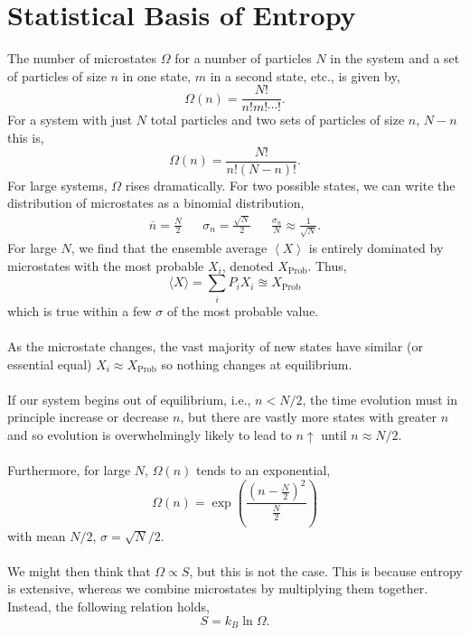 \documentclass{book}
\begin{document}
\section{Statistical Basis of Entropy}
The number of microstates $\Omega$ for a number of particles $N$ in the system and a set of particles of size $n$ in one state, $m$ in a second state, etc., is given by,
\begin{equation}
	\Omega(n) = \frac{N!}{n!m!\cdots!}.
\end{equation}
For a system with just $N$ total particles and two sets of particles of size $n$, $N-n$ this is,
\begin{equation}
	\Omega(n) = \frac{N!}{n!(N-n)!}.
\end{equation}
For large systems, $\Omega$ rises dramatically. For two possible states, we can write the distribution of microstates as a binomial distribution,
\begin{align}
	\overline{n} = \frac{N}{2} && \sigma_n = \frac{\sqrt{N}}{2} && \frac{\sigma_n}{N} \approx \frac{1}{\sqrt{N}}.
\end{align}
For large $N$, we find that the ensemble average $\left<X\right>$ is entirely dominated by microstates with the most probable $X_i$, denoted $X_{\text{Prob}}$. Thus,
\begin{equation}
	\langle X \rangle = \sum_i P_i X_i \approxeq X_{\text{Prob}}
\end{equation}
which is true within a few $\sigma$ of the most probable value.
\\\\
As the microstate changes, the vast majority of new states have similar (or essential equal) $X_i \approx X_{\text{Prob}}$ so nothing changes at equilibrium.
\\\\
If our system begins out of equilibrium, i.e., $n < N/2$, the time evolution must in principle increase or decrease $n$, but there are vastly more states with greater $n$ and so evolution is overwhelmingly likely to lead to $n \uparrow$ until $n \approx N/2$. 
\\\\
Furthermore, for large $N$, $\Omega(n)$ tends to an exponential,
\begin{equation}
	\Omega(n) = \exp\left(\frac{\left(n - \frac{N}{2}\right)^2}{\frac{N}{2}}\right)
\end{equation}
with mean $N/2$, $\sigma = \sqrt{N}/2$.
\\\\
We might then think that $\Omega \propto S$, but this is not the case. This is because entropy is extensive, whereas we combine microstates by multiplying them together. Instead, the following relation holds,
\begin{equation}
	S = k_B \ln\Omega.
\end{equation}
\end{document}
